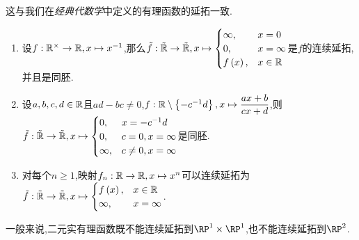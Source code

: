 \begin{remark}{}{}
	这与我们在\textit{经典代数学}中定义的有理函数的延拓一致.
\end{remark}

\begin{corollary}{}{}
	\begin{enumerate}
		\item 设$f:\mathbb{R}^{\times}\to\mathbb{R},x\mapsto x^{-1}$,那么$\tilde{f}:\tilde{\mathbb{R}}\to\tilde{\mathbb{R}},x\mapsto
		\begin{cases}
			\infty,&x=0\\
			0,&x=\infty\\
			f\left(x\right),&x\in\mathbb{R}
		\end{cases}$是$f$的连续延拓,并且是同胚.
		\item 设$a,b,c,d\in\mathbb{R}$且$ad-bc\neq 0$,$f:\mathbb{R}\setminus\left\{-c^{-1}d\right\},x\mapsto\dfrac{ax+b}{cx+d}$,则$\tilde{f}:\tilde{\mathbb{R}}\to\tilde{\mathbb{R}},x\mapsto
		\begin{cases}
			0,&x=-c^{-1}d\\
			0,&c=0,x=\infty\\
			\infty,&c\neq 0,x=\infty
		\end{cases}$是同胚.
		\item 对每个$n\geq 1$,映射$f_{n}:\mathbb{R}\to\mathbb{R},x\mapsto x^{n}$可以连续延拓为$\tilde{f}:\tilde{\mathbb{R}}\to\tilde{\mathbb{R}},x\mapsto
		\begin{cases}
			f\left(x\right),&x\in\mathbb{R}\\
			\infty,&x=\infty
		\end{cases}$.
	\end{enumerate}
\end{corollary}

\begin{remark}{}{}
	一般来说,二元实有理函数既不能连续延拓到$\RP^{1}\times\RP^{1}$,也不能连续延拓到$\RP^{2}$.
\end{remark}